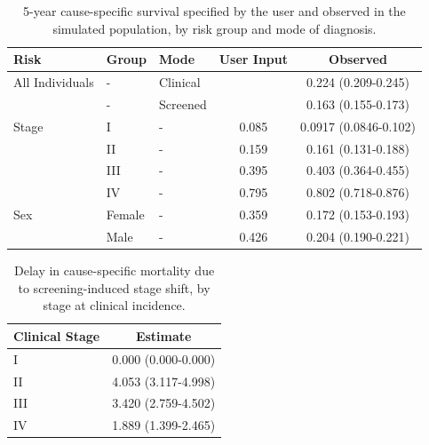 \documentclass[11pt]{article}
\begin{document}
\begin{table}[!ht]
\centering
\begin{tabular}{lllcc}
  \hline
Risk & Group & Mode & User Input & Observed \\ 
  \hline
All Individuals & - & Clinical &  & 0.224 (0.209-0.245) \\ 
   & - & Screened &  & 0.163 (0.155-0.173) \\ 
  Stage & I & - & 0.085 & 0.0917 (0.0846-0.102) \\ 
   & II & - & 0.159 & 0.161 (0.131-0.188) \\ 
   & III & - & 0.395 & 0.403 (0.364-0.455) \\ 
   & IV & - & 0.795 & 0.802 (0.718-0.876) \\ 
  Sex & Female & - & 0.359 & 0.172 (0.153-0.193) \\ 
   & Male & - & 0.426 & 0.204 (0.190-0.221) \\ 
   \hline
\end{tabular}
\caption{5-year cause-specific survival specified by the user and observed in the simulated population, by risk group and mode of diagnosis.} 
\label{tab:csm}
\end{table}

\begin{table}[!ht]
\centering
\begin{tabular}{lc}
  \hline
Clinical Stage & Estimate \\ 
  \hline
I & 0.000 (0.000-0.000) \\ 
  II & 4.053 (3.117-4.998) \\ 
  III & 3.420 (2.759-4.502) \\ 
  IV & 1.889 (1.399-2.465) \\ 
   \hline
\end{tabular}
\caption{Delay in cause-specific mortality due to screening-induced stage shift, by stage at clinical incidence.} 
\label{tab:delay}
\end{table}


\end{document}
